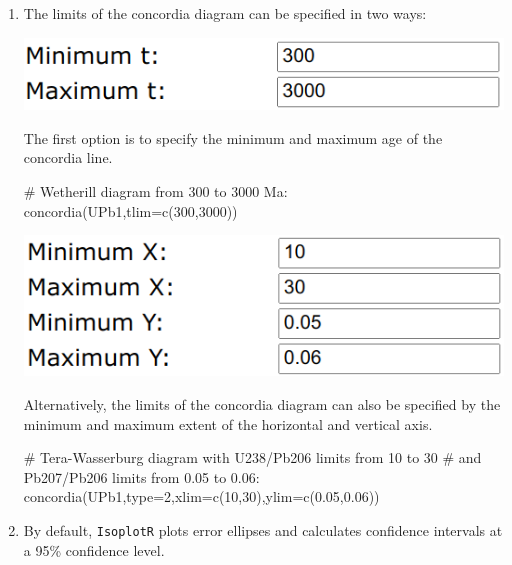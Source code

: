 \begin{refsection}
\begin{enumerate}
\item The limits of the concordia diagram can be specified in two
  ways:

  \noindent\begin{minipage}[t]{.4\linewidth}
  \strut\vspace*{-\baselineskip}\newline
  \includegraphics[width=\linewidth]{../figures/Concordiatlim.png}
\end{minipage}
\begin{minipage}[t]{.6\linewidth}
  The first option is to specify the minimum and maximum age of the
  concordia line.
\end{minipage}

\begin{script}
# Wetherill diagram from 300 to 3000 Ma:
concordia(UPb1,tlim=c(300,3000)) 
\end{script}

\noindent\begin{minipage}[t]{.4\linewidth}
  \strut\vspace*{-\baselineskip}\newline
  \includegraphics[width=\linewidth]{../figures/ConcordiaXYlim.png}
\end{minipage}
\begin{minipage}[t]{.6\linewidth}
  Alternatively, the limits of the concordia diagram can also be
  specified by the minimum and maximum extent of the horizontal and
  vertical axis.
\end{minipage}

\begin{script}
# Tera-Wasserburg diagram with U238/Pb206 limits from 10 to 30
# and Pb207/Pb206 limits from 0.05 to 0.06:
concordia(UPb1,type=2,xlim=c(10,30),ylim=c(0.05,0.06))
\end{script}

\item By default, \texttt{IsoplotR} plots error ellipses and
  calculates confidence intervals at a 95\% confidence level.


\end{enumerate}
\end{refsection}
